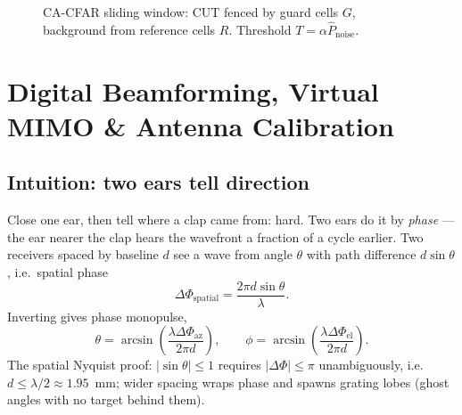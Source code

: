 \documentclass[11pt,oneside]{book}
\begin{document}
\begin{figure}[htbp]
\centering
{}
\caption{CA-CFAR sliding window: CUT fenced by guard cells $G$, background
from reference cells $R$. Threshold $T=\alpha\hat{P}_{\mathrm{noise}}$.}
\label{fig:cfar-window}
\end{figure}

\chapter{Digital Beamforming, Virtual MIMO \& Antenna Calibration}
\label{ch:beamforming}

\section{Intuition: two ears tell direction}
\label{sec:two-ears}

Close one ear, then tell where a clap came from: hard. Two ears do it by
\emph{phase} --- the ear nearer the clap hears the wavefront a fraction of
a cycle earlier. Two receivers spaced by baseline $d$ see a wave from angle
$\theta$ with path difference $d\sin\theta$, i.e.\ spatial phase
\begin{equation}
\boxed{\Delta\Phi_{\mathrm{spatial}}=\frac{2\pi d\sin\theta}{\lambda}.}
\label{eq:spatial-phase}
\end{equation}
Inverting gives phase monopulse,
\begin{equation}
\theta=\arcsin\!\left(\frac{\lambda\Delta\Phi_{\mathrm{az}}}{2\pi d}\right),
\qquad
\phi=\arcsin\!\left(\frac{\lambda\Delta\Phi_{\mathrm{el}}}{2\pi d}\right).
\label{eq:monopulse}
\end{equation}
The spatial Nyquist proof: $|\sin\theta|\le1$ requires
$|\Delta\Phi|\le\pi$ unambiguously, i.e.\ $d\le\lambda/2\approx1.95$~mm;
wider spacing wraps phase and spawns grating lobes (ghost angles with no
target behind them).
\end{document}
